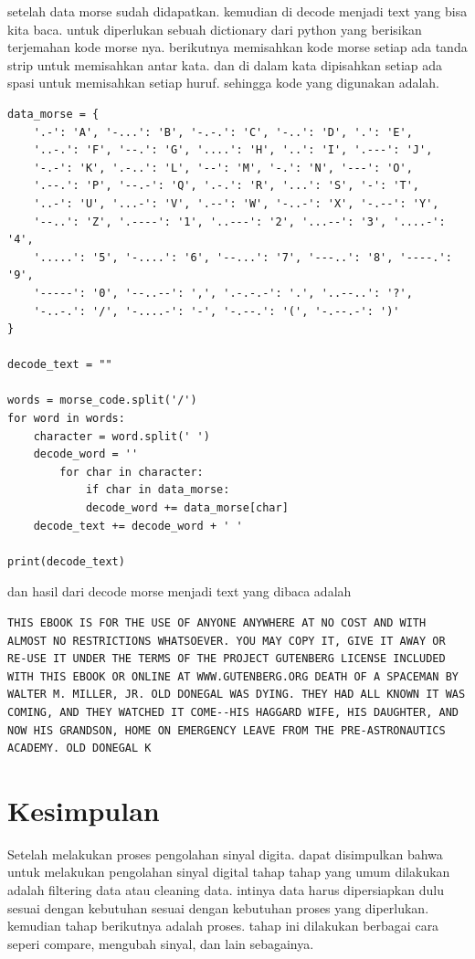 \documentclass[]{article}
\begin{document}
setelah data morse sudah didapatkan. kemudian di decode menjadi text yang bisa kita baca. untuk diperlukan sebuah dictionary dari python yang berisikan terjemahan kode morse nya. berikutnya  memisahkan kode morse setiap ada tanda strip untuk memisahkan antar kata. dan di dalam kata dipisahkan setiap ada spasi untuk memisahkan setiap huruf. sehingga kode yang digunakan adalah.
\begin{lstlisting}
data_morse = {
	'.-': 'A', '-...': 'B', '-.-.': 'C', '-..': 'D', '.': 'E',
	'..-.': 'F', '--.': 'G', '....': 'H', '..': 'I', '.---': 'J',
	'-.-': 'K', '.-..': 'L', '--': 'M', '-.': 'N', '---': 'O',
	'.--.': 'P', '--.-': 'Q', '.-.': 'R', '...': 'S', '-': 'T',
	'..-': 'U', '...-': 'V', '.--': 'W', '-..-': 'X', '-.--': 'Y',
	'--..': 'Z', '.----': '1', '..---': '2', '...--': '3', '....-': '4',
	'.....': '5', '-....': '6', '--...': '7', '---..': '8', '----.': '9',
	'-----': '0', '--..--': ',', '.-.-.-': '.', '..--..': '?',
	'-..-.': '/', '-....-': '-', '-.--.': '(', '-.--.-': ')'
}

decode_text = ""

words = morse_code.split('/')
for word in words:
	character = word.split(' ')
	decode_word = ''
		for char in character:
			if char in data_morse:
			decode_word += data_morse[char]
	decode_text += decode_word + ' '

print(decode_text)
\end{lstlisting}
dan hasil dari decode morse menjadi text yang dibaca adalah

\begin{lstlisting}
THIS EBOOK IS FOR THE USE OF ANYONE ANYWHERE AT NO COST AND WITH ALMOST NO RESTRICTIONS WHATSOEVER. YOU MAY COPY IT, GIVE IT AWAY OR RE-USE IT UNDER THE TERMS OF THE PROJECT GUTENBERG LICENSE INCLUDED WITH THIS EBOOK OR ONLINE AT WWW.GUTENBERG.ORG DEATH OF A SPACEMAN BY WALTER M. MILLER, JR. OLD DONEGAL WAS DYING. THEY HAD ALL KNOWN IT WAS COMING, AND THEY WATCHED IT COME--HIS HAGGARD WIFE, HIS DAUGHTER, AND NOW HIS GRANDSON, HOME ON EMERGENCY LEAVE FROM THE PRE-ASTRONAUTICS ACADEMY. OLD DONEGAL K
\end{lstlisting}

\section{Kesimpulan}
Setelah melakukan proses pengolahan sinyal digita. dapat disimpulkan bahwa untuk melakukan pengolahan sinyal digital tahap tahap yang umum dilakukan adalah filtering data atau cleaning data. intinya data harus  dipersiapkan dulu sesuai dengan kebutuhan sesuai dengan kebutuhan proses yang diperlukan. kemudian tahap berikutnya adalah proses. tahap ini dilakukan berbagai cara seperi compare, mengubah sinyal, dan lain sebagainya.
\end{document}
